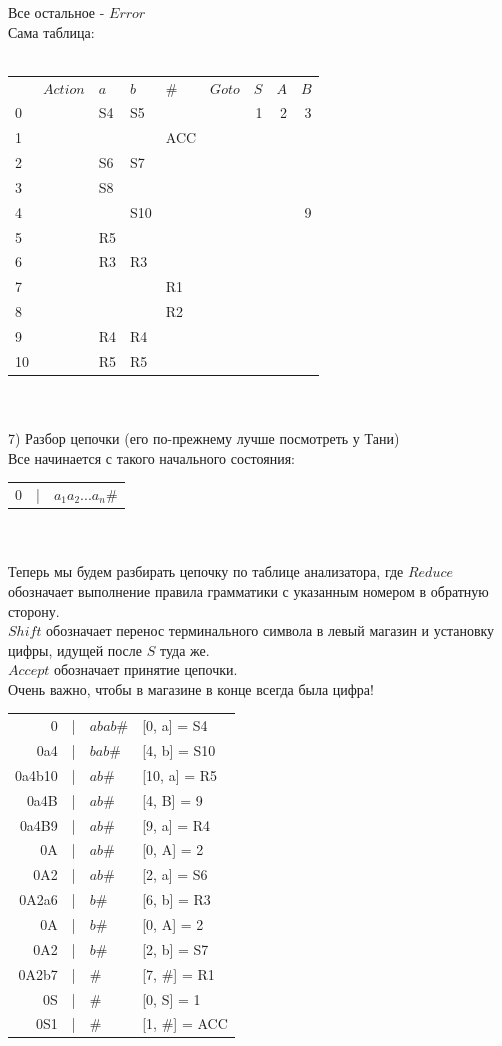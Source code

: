 \documentclass[14pt]{extreport}
\begin{document}
	Все остальное - $Error$\\
	Сама таблица:\\\\
	\begin{tabular}{lllllrrrr}
		& $Action$ & $a$ & $b$ & $\#$ & $Goto$ & $S$ & $A$ & $B$ \\
		0 && S4 & S5 &&& 1 & 2 & 3\\
		1 &&&& ACC\\
		2 && S6 & S7\\
		3 && S8\\
		4 &&& S10 &&&&& 9\\
		5 && R5\\
		6 && R3 & R3\\
		7 &&&& R1\\
		8 &&&& R2\\
		9 && R4 & R4\\
		10 && R5 & R5\\
	\end{tabular}\\\\
	7) Разбор цепочки (его по-прежнему лучше посмотреть у Тани)\\
	Все начинается с такого начального состояния:\\
	\begin{tabular}{rcl}
		0 & | & $a_1a_2...a_n\#$
	\end{tabular}\\\\
	Теперь мы будем разбирать цепочку по таблице анализатора, где
	$Reduce$ обозначает выполнение правила грамматики с указанным номером в обратную сторону.\\
	$Shift$ обозначает перенос терминального символа в левый магазин и установку цифры,
	идущей после $S$ туда же.\\
	$Accept$ обозначает принятие цепочки.\\
	Очень важно, чтобы в магазине в конце всегда была цифра!\\
	\begin{tabular}{rcll}
		0 & | & $abab\#$ & [0, a] = S4\\
		0a4 & | & $bab\#$ & [4, b] = S10\\
		0a4b10 & | & $ab\#$ & [10, a] = R5\\
		0a4B & | & $ab\#$ & [4, B] = 9\\
		0a4B9 & | & $ab\#$ & [9, a] = R4\\
		0A & | & $ab\#$ & [0, A] = 2\\
		0A2 & | & $ab\#$ & [2, a] = S6\\
		0A2a6 & | & $b\#$ & [6, b] =  R3\\
		0A & | & $b\#$ & [0, A] = 2\\
		0A2 & | & $b\#$ & [2, b] = S7\\
		0A2b7 & | & $\#$ & [7, $\#$] = R1\\
		0S & | & $\#$ & [0, S] = 1\\
		0S1 & | & $\#$ & [1, $\#$] = ACC
	\end{tabular}\\\\
\end{document}
